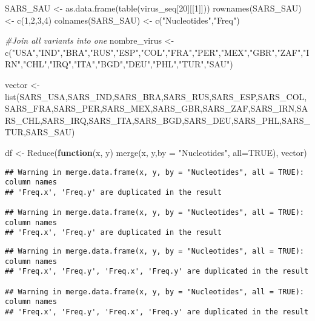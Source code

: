 \documentclass[
]{article}
\newenvironment{Shaded}{\begin{snugshade}}{\end{snugshade}}
\newcommand{\AttributeTok}[1]{\textcolor[rgb]{0.77,0.63,0.00}{#1}}
\newcommand{\CommentTok}[1]{\textcolor[rgb]{0.56,0.35,0.01}{\textit{#1}}}
\newcommand{\ConstantTok}[1]{\textcolor[rgb]{0.00,0.00,0.00}{#1}}
\newcommand{\ControlFlowTok}[1]{\textcolor[rgb]{0.13,0.29,0.53}{\textbf{#1}}}
\newcommand{\DecValTok}[1]{\textcolor[rgb]{0.00,0.00,0.81}{#1}}
\newcommand{\FunctionTok}[1]{\textcolor[rgb]{0.00,0.00,0.00}{#1}}
\newcommand{\NormalTok}[1]{#1}
\newcommand{\OtherTok}[1]{\textcolor[rgb]{0.56,0.35,0.01}{#1}}
\newcommand{\StringTok}[1]{\textcolor[rgb]{0.31,0.60,0.02}{#1}}
\begin{document}
\begin{Shaded}
\begin{Highlighting}[]
\NormalTok{SARS\_SAU }\OtherTok{\textless{}{-}} \FunctionTok{as.data.frame}\NormalTok{(}\FunctionTok{table}\NormalTok{(virus\_seq[}\DecValTok{20}\NormalTok{][[}\DecValTok{1}\NormalTok{]]))}
\FunctionTok{rownames}\NormalTok{(SARS\_SAU) }\OtherTok{\textless{}{-}} \FunctionTok{c}\NormalTok{(}\DecValTok{1}\NormalTok{,}\DecValTok{2}\NormalTok{,}\DecValTok{3}\NormalTok{,}\DecValTok{4}\NormalTok{)}
\FunctionTok{colnames}\NormalTok{(SARS\_SAU) }\OtherTok{\textless{}{-}} \FunctionTok{c}\NormalTok{(}\StringTok{"Nucleotides"}\NormalTok{,}\StringTok{"Freq"}\NormalTok{)}

\CommentTok{\#Join all variants into one}
\NormalTok{nombre\_virus }\OtherTok{\textless{}{-}} \FunctionTok{c}\NormalTok{(}\StringTok{"USA"}\NormalTok{,}\StringTok{"IND"}\NormalTok{,}\StringTok{"BRA"}\NormalTok{,}\StringTok{"RUS"}\NormalTok{,}\StringTok{"ESP"}\NormalTok{,}\StringTok{"COL"}\NormalTok{,}\StringTok{"FRA"}\NormalTok{,}\StringTok{"PER"}\NormalTok{,}\StringTok{"MEX"}\NormalTok{,}\StringTok{"GBR"}\NormalTok{,}\StringTok{"ZAF"}\NormalTok{,}\StringTok{"IRN"}\NormalTok{,}\StringTok{"CHL"}\NormalTok{,}\StringTok{"IRQ"}\NormalTok{,}\StringTok{"ITA"}\NormalTok{,}\StringTok{"BGD"}\NormalTok{,}\StringTok{"DEU"}\NormalTok{,}\StringTok{"PHL"}\NormalTok{,}\StringTok{"TUR"}\NormalTok{,}\StringTok{"SAU"}\NormalTok{)}

\NormalTok{vector }\OtherTok{\textless{}{-}} \FunctionTok{list}\NormalTok{(SARS\_USA,SARS\_IND,SARS\_BRA,SARS\_RUS,SARS\_ESP,SARS\_COL,SARS\_FRA,SARS\_PER,SARS\_MEX,SARS\_GBR,SARS\_ZAF,SARS\_IRN,SARS\_CHL,SARS\_IRQ,SARS\_ITA,SARS\_BGD,SARS\_DEU,SARS\_PHL,SARS\_TUR,SARS\_SAU)}

\NormalTok{df }\OtherTok{\textless{}{-}} \FunctionTok{Reduce}\NormalTok{(}\ControlFlowTok{function}\NormalTok{(x, y) }\FunctionTok{merge}\NormalTok{(x, y,}\AttributeTok{by =} \StringTok{"Nucleotides"}\NormalTok{, }\AttributeTok{all=}\ConstantTok{TRUE}\NormalTok{), vector)}
\end{Highlighting}
\end{Shaded}

\begin{verbatim}
## Warning in merge.data.frame(x, y, by = "Nucleotides", all = TRUE): column names
## 'Freq.x', 'Freq.y' are duplicated in the result

## Warning in merge.data.frame(x, y, by = "Nucleotides", all = TRUE): column names
## 'Freq.x', 'Freq.y' are duplicated in the result
\end{verbatim}

\begin{verbatim}
## Warning in merge.data.frame(x, y, by = "Nucleotides", all = TRUE): column names
## 'Freq.x', 'Freq.y', 'Freq.x', 'Freq.y' are duplicated in the result

## Warning in merge.data.frame(x, y, by = "Nucleotides", all = TRUE): column names
## 'Freq.x', 'Freq.y', 'Freq.x', 'Freq.y' are duplicated in the result
\end{verbatim}
\end{document}
